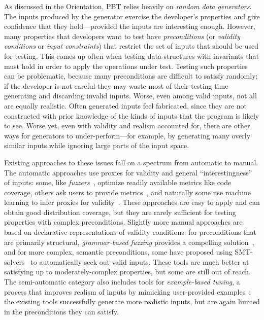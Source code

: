 %
As discussed in the Orientation, PBT relies heavily on {\em random data
generators}. The inputs produced by the generator exercise the developer's
properties and give confidence that they hold---provided the inputs are
interesting enough.
%
However,
many properties that developers want to test have {\em preconditions}
(or {\em validity conditions} or {\em input constraints}) that
restrict the set of inputs that should be used for testing. This comes up often
when testing data structures with invariants that must hold in order to apply
the operations under test. Testing such properties can be problematic, because
many preconditions are difficult to satisfy randomly; if the developer is not
careful they may waste most of their testing time generating and
discarding invalid inputs.
%
Worse, even among valid inputs, not all are equally realistic. Often generated inputs
feel fabricated, since they are not constructed with prior knowledge of the
kinds of inputs that the program is likely to see.
%
Worse yet, even with validity and realism accounted for, there are
other ways for generators to under-perform---for example, by
generating many overly similar inputs while ignoring large parts of
the input space.


Existing approaches to these issues
fall on a spectrum from automatic to manual. The automatic approaches use
proxies for validity and general ``interestingness'' of inputs: some, like {\em
fuzzers}~\cite{afl-readme}, optimize readily available metrics like code
coverage, others ask users to provide metrics~\cite{loscher2017targetedpbt}, and
naturally some use machine learning to infer proxies for
validity~\cite{godefroid2017learn, DBLP:conf/icse/ReddyLPS20}. These approaches
are easy to apply and can obtain good distribution coverage, but they are rarely
sufficient for testing properties with complex preconditions. Slightly more
manual approaches are based on declarative representations of validity
conditions: for preconditions that are primarily structural, {\em grammar-based
fuzzing} provides a compelling solution~\cite{godefroid2008grammar,
holler2012fuzzing, veggalam2016ifuzzer, wang2019superion,
srivastava2021gramatron}, and for more complex, semantic preconditions, some
have proposed using SMT-solvers~\cite{dewey2017automated, LuckPOPL,
steinhofel2022input} to automatically seek out valid inputs. These tools are
much better at satisfying up to moderately-complex properties, but some are
still out of reach. The semi-automatic
category also includes tools for {\em example-based tuning}, a process that
improves realism of inputs by mimicking user-provided
examples~\cite{soremekun2020inputs}; the existing tools successfully generate
more realistic inputs, but are again limited in the preconditions they can
satisfy.

